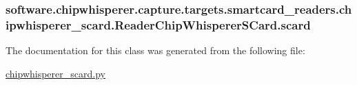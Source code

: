 \subsubsection[{scard}]{\setlength{\rightskip}{0pt plus 5cm}software.\+chipwhisperer.\+capture.\+targets.\+smartcard\+\_\+readers.\+chipwhisperer\+\_\+scard.\+Reader\+Chip\+Whisperer\+S\+Card.\+scard}\label{classsoftware_1_1chipwhisperer_1_1capture_1_1targets_1_1smartcard__readers_1_1chipwhisperer__scard_1_1ReaderChipWhispererSCard_a331e48d4b114ab186054418d646e68aa}


The documentation for this class was generated from the following file\+:\begin{DoxyCompactItemize}
\item 
\hyperlink{chipwhisperer__scard_8py}{chipwhisperer\+\_\+scard.\+py}\end{DoxyCompactItemize}
